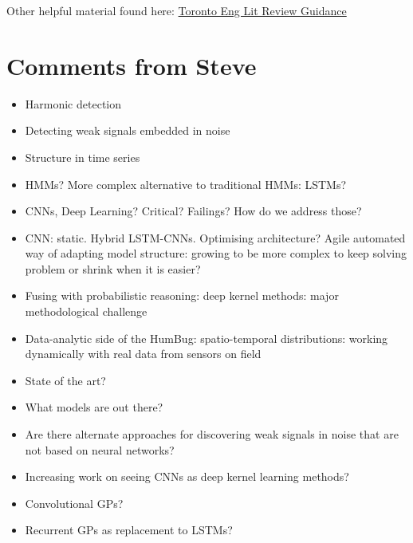 \documentclass[12pt]{llncs}
\begin{document}
Other helpful material found here: \href{http://ecp.engineering.utoronto.ca/online-handbook/components-of-documents/literature-reviews/}{Toronto Eng Lit Review Guidance}


\section{Comments from Steve}
\begin{itemize}
	\item Harmonic detection
	\item Detecting weak signals embedded in noise
	\item Structure in time series
	\item HMMs? More complex alternative to traditional HMMs: LSTMs?
	\item CNNs, Deep Learning? Critical? Failings? How do we address those?
	\item CNN: static. Hybrid LSTM-CNNs. Optimising architecture? Agile automated way of adapting model structure: growing to be more complex to keep solving problem or shrink when it is easier?
	\item Fusing with probabilistic reasoning: deep kernel methods: major methodological challenge


	\item Data-analytic side of the HumBug: spatio-temporal distributions: working dynamically with real data from sensors on field
	\item State of the art?
	\item What models are out there?
	\item Are there alternate approaches for discovering weak signals in noise that are not based on neural networks?
	\item Increasing work on seeing CNNs as deep kernel learning methods?
	\item Convolutional GPs?
	\item Recurrent GPs as replacement to LSTMs?
\end{itemize}
\end{document}
